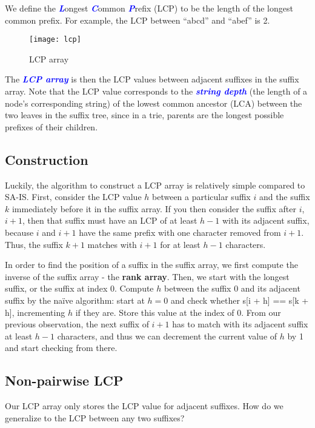 \documentclass[11pt, oneside]{article}
\newcommand{\emphasis}[1]{\textcolor{blue}{\textbf{\textit{#1}}}}
\begin{document}
We define the \emphasis{L}ongest \emphasis{C}ommon \emphasis{P}refix (LCP)
to be the length of the longest common prefix.
For example, the LCP between ``abcd'' and ``abef'' is 2.

\begin{figure}[h!]
\centering
\texttt{[image: lcp]}
\caption{LCP array}
\end{figure}

The \emphasis{LCP array} is then the LCP values between adjacent suffixes in the suffix array.
Note that the LCP value corresponds to the \emphasis{string depth}
(the length of a node's corresponding string)
of the lowest common ancestor (LCA) between the two leaves in the suffix tree,
since in a trie, parents are the longest possible prefixes of their children.

\subsection{Construction}

Luckily, the algorithm to construct a LCP array is relatively simple compared to SA-IS.
First, consider the LCP value \( h \) between a particular suffix \( i \)
and the suffix \( k \) immediately before it in the suffix array.
If you then consider the suffix after \( i \), \( i + 1 \), then that suffix must
have an LCP of at least \( h - 1 \) with its adjacent suffix, because \( i \) and \( i + 1 \)
have the same prefix with one character removed from \( i + 1 \). Thus, the
suffix \( k + 1 \) matches with \( i + 1 \) for at least \( h - 1 \) characters.

In order to find the position of a suffix in the suffix array, we first compute
the inverse of the suffix array - the \textbf{rank array}.
Then, we start with the longest suffix, or the suffix at index 0.
Compute \( h \) between the suffix 0 and its adjacent suffix by the naïve algorithm: start at \( h = 0 \) and check whether s[i + h] == s[k + h], incrementing \( h \) if they are.
Store this value at the index of 0.
From our previous observation, the next suffix of \( i + 1 \) has to match with its adjacent suffix
at least \( h - 1 \) characters, and thus we can decrement the current value of \( h \)
by 1 and start checking from there.

\subsection{Non-pairwise LCP}

Our LCP array only stores the LCP value for adjacent suffixes.
How do we generalize to the LCP between any two suffixes?
\end{document}
